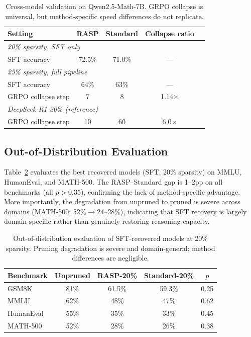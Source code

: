 \documentclass[11pt,a4paper]{article}
\begin{document}
\begin{table}[t]
\centering
\small
\caption{Cross-model validation on Qwen2.5-Math-7B. GRPO collapse is universal, but method-specific speed differences do not replicate.}
\label{tab:crossmodel}
\begin{tabular}{lcccc}
\toprule
\textbf{Setting} & \textbf{RASP} & \textbf{Standard} & \textbf{Collapse ratio} \\
\midrule
\multicolumn{4}{l}{\emph{20\% sparsity, SFT only}} \\
SFT accuracy & 72.5\% & 71.0\% & --- \\
\midrule
\multicolumn{4}{l}{\emph{25\% sparsity, full pipeline}} \\
SFT accuracy & 64\% & 63\% & --- \\
GRPO collapse step & 7 & 8 & 1.14$\times$ \\
\midrule
\multicolumn{4}{l}{\emph{DeepSeek-R1 20\% (reference)}} \\
GRPO collapse step & 10 & 60 & 6.0$\times$ \\
\bottomrule
\end{tabular}
\end{table}

\subsection{Out-of-Distribution Evaluation}
\label{sec:ood}

Table~\ref{tab:ood} evaluates the best recovered models (SFT, 20\% sparsity) on MMLU, HumanEval, and MATH-500. The RASP--Standard gap is 1--2pp on all benchmarks (all $p > 0.35$), confirming the lack of method-specific advantage. More importantly, the degradation from unpruned to pruned is severe across domains (MATH-500: 52\%$\to$24--28\%), indicating that SFT recovery is largely domain-specific rather than genuinely restoring reasoning capacity.

\begin{table}[t]
\centering
\small
\caption{Out-of-distribution evaluation of SFT-recovered models at 20\% sparsity. Pruning degradation is severe and domain-general; method differences are negligible.}
\label{tab:ood}
\begin{tabular}{lcccc}
\toprule
\textbf{Benchmark} & \textbf{Unpruned} & \textbf{RASP-20\%} & \textbf{Standard-20\%} & $p$ \\
\midrule
GSM8K & 81\% & 61.5\% & 59.3\% & 0.25 \\
MMLU & 62\% & 48\% & 47\% & 0.62 \\
HumanEval & 55\% & 35\% & 33\% & 0.45 \\
MATH-500 & 52\% & 28\% & 26\% & 0.38 \\
\bottomrule
\end{tabular}
\end{table}
\end{document}
